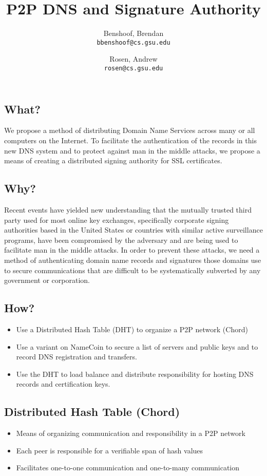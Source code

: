 \documentclass{IEEEtran}
\author{
  Benshoof, Brendan\\
  \texttt{bbenshoof@cs.gsu.edu}
  \and
  Rosen, Andrew\\
  \texttt{rosen@cs.gsu.edu}
}
\title{P2P DNS and Signature Authority}
\begin{document}
\maketitle
\subsection{What?}

We propose a method of distributing Domain Name Services across many or
all computers on the Internet. To facilitate the authentication of the
records in this new DNS system and to protect against man in the middle
attacks, we propose a means of creating a distributed signing authority
for SSL certificates.

\subsection{Why?}

Recent events have yielded new understanding that the mutually trusted
third party used for most online key exchanges, specifically corporate
signing authorities based in the United States or countries with similar
active surveillance programs, have been compromised by the adversary and
are being used to facilitate man in the middle attacks. In order to
prevent these attacks, we need a method of authenticating domain name
records and signatures those domains use to secure communications that
are difficult to be systematically subverted by any government or
corporation.

\subsection{How?}

\begin{itemize}
\item
  Use a Distributed Hash Table (DHT) to organize a P2P network (Chord)
\item
  Use a variant on NameCoin to secure a list of servers and public keys
  and to record DNS registration and transfers.
\item
  Use the DHT to load balance and distribute responsibility for hosting
  DNS records and certification keys.
\end{itemize}
\subsection{Distributed Hash Table (Chord)}

\begin{itemize}
\item
  Means of organizing communication and responsibility in a P2P network
\item
  Each peer is responsible for a verifiable span of hash values
\item
  Facilitates one-to-one communication and one-to-many communication
\end{itemize}
\end{document}
